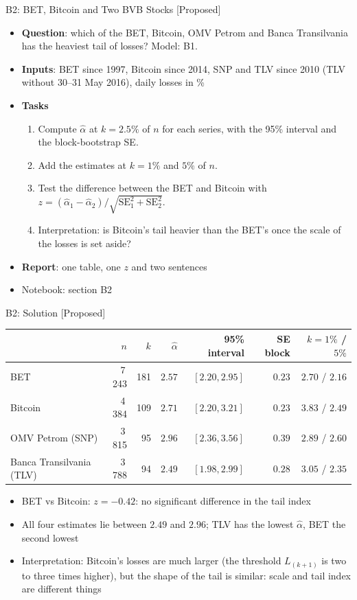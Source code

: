 \begin{frame}{B2: BET, Bitcoin and Two BVB Stocks [Proposed]}
\itemsize{\footnotesize}
\begin{itemize}
\item \textbf{Question}: which of the BET, Bitcoin, OMV Petrom and Banca Transilvania has the heaviest tail of losses? Model: B1.
\item \textbf{Inputs}: BET since 1997, Bitcoin since 2014, SNP and TLV since 2010 (TLV without 30--31 May 2016), daily losses in \%
\item \textbf{Tasks}
\begin{enumerate}
    \item Compute $\hat\alpha$ at $k = 2.5\%$ of $n$ for each series, with the 95\% interval and the block-bootstrap SE.
    \item Add the estimates at $k = 1\%$ and $5\%$ of $n$.
    \item Test the difference between the BET and Bitcoin with $z = (\hat\alpha_1 - \hat\alpha_2)/\sqrt{\mathrm{SE}_1^2 + \mathrm{SE}_2^2}$.
    \item Interpretation: is Bitcoin's tail heavier than the BET's once the scale of the losses is set aside?
\end{enumerate}
\item \textbf{Report}: one table, one $z$ and two sentences
\item Notebook: section B2
\end{itemize}
\end{frame}

\ifsolutions
\begin{frame}{B2: Solution [Proposed]}
\itemsize{\footnotesize}
\begin{center}
\footnotesize
\begin{tabular}{lrrrrrr}
\toprule
& $n$ & $k$ & $\hat\alpha$ & 95\% interval & SE block & $k = 1\%$ / $5\%$ \\
\midrule
BET & 7\,243 & 181 & $2.57$ & $[2.20, 2.95]$ & $0.23$ & $2.70$ / $2.16$ \\
Bitcoin & 4\,384 & 109 & $2.71$ & $[2.20, 3.21]$ & $0.23$ & $3.83$ / $2.49$ \\
OMV Petrom (SNP) & 3\,815 & 95 & $2.96$ & $[2.36, 3.56]$ & $0.39$ & $2.89$ / $2.60$ \\
Banca Transilvania (TLV) & 3\,788 & 94 & $2.49$ & $[1.98, 2.99]$ & $0.28$ & $3.05$ / $2.35$ \\
\bottomrule
\end{tabular}
\end{center}
\begin{itemize}
    \item BET vs Bitcoin: $z = -0.42$: no significant difference in the tail index
    \item All four estimates lie between $2.49$ and $2.96$; TLV has the lowest $\hat\alpha$, BET the second lowest
    \item Interpretation: Bitcoin's losses are much larger (the threshold $L_{(k+1)}$ is two to three times higher), but the shape of the tail is similar: scale and tail index are different things
\end{itemize}
\end{frame}
\fi

